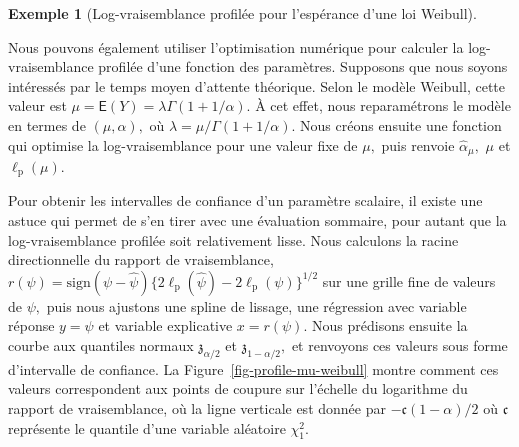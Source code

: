 \documentclass[
  11pt,
  letterpaper,
]{scrbook}
\theoremstyle{plain}
\theoremstyle{plain}
\theoremstyle{definition}
\newtheorem{example}{Exemple}[chapter]
\theoremstyle{definition}
\theoremstyle{remark}
\begin{document}
\begin{example}[Log-vraisemblance profilée pour l'espérance d'une loi
Weibull]\protect\hypertarget{exm-profile-mean-weibull}{}\label{exm-profile-mean-weibull}

Nous pouvons également utiliser l'optimisation numérique pour calculer
la log-vraisemblance profilée d'une fonction des paramètres. Supposons
que nous soyons intéressés par le temps moyen d'attente théorique. Selon
le modèle Weibull, cette valeur est
\(\mu = \mathsf{E}(Y) = \lambda\Gamma(1+1/\alpha).\) À cet effet, nous
reparamétrons le modèle en termes de \((\mu, \alpha),\) où
\(\lambda=\mu/\Gamma(1+1/\alpha).\) Nous créons ensuite une fonction qui
optimise la log-vraisemblance pour une valeur fixe de \(\mu,\) puis
renvoie \(\widehat{\alpha}_{\mu},\) \(\mu\) et
\(\ell_{\mathrm{p}}(\mu).\)

Pour obtenir les intervalles de confiance d'un paramètre scalaire, il
existe une astuce qui permet de s'en tirer avec une évaluation sommaire,
pour autant que la log-vraisemblance profilée soit relativement lisse.
Nous calculons la racine directionnelle du rapport de vraisemblance,
\(r(\psi) = \mathrm{sign}(\psi - \widehat{\psi})\{2\ell_{\mathrm{p}}(\widehat{\psi}) -2 \ell_{\mathrm{p}}(\psi)\}^{1/2}\)
sur une grille fine de valeurs de \(\psi,\) puis nous ajustons une
spline de lissage, une régression avec variable réponse \(y=\psi\) et
variable explicative \(x=r(\psi).\) Nous prédisons ensuite la courbe aux
quantiles normaux \(\mathfrak{z}_{\alpha/2}\) et
\(\mathfrak{z}_{1-\alpha/2},\) et renvoyons ces valeurs sous forme
d'intervalle de confiance. La Figure~\ref{fig-profile-mu-weibull} montre
comment ces valeurs correspondent aux points de coupure sur l'échelle du
logarithme du rapport de vraisemblance, où la ligne verticale est donnée
par \(-\mathfrak{c}(1-\alpha)/2\) où \(\mathfrak{c}\) représente le
quantile d'une variable aléatoire \(\chi^2_1.\)


\end{example}
\end{document}
